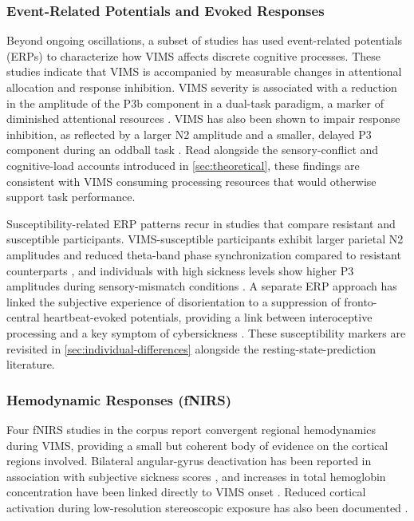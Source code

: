 \subsubsection{Event-Related Potentials and Evoked Responses}
Beyond ongoing oscillations, a subset of studies has used event-related potentials (ERPs) to characterize how VIMS affects discrete cognitive processes.
These studies indicate that VIMS is accompanied by measurable changes in attentional allocation and response inhibition.
VIMS severity is associated with a reduction in the amplitude of the P3b component in a dual-task paradigm, a marker of diminished attentional resources \cite{mimnaughVirtualRealitySickness2023}.
VIMS has also been shown to impair response inhibition, as reflected by a larger N2 amplitude and a smaller, delayed P3 component during an oddball task \cite{wuInhibitionrelatedN2P32020}.
Read alongside the sensory-conflict and cognitive-load accounts introduced in \autoref{sec:theoretical}, these findings are consistent with VIMS consuming processing resources that would otherwise support task performance.

Susceptibility-related ERP patterns recur in studies that compare resistant and susceptible participants.
VIMS-susceptible participants exhibit larger parietal N2 amplitudes and reduced theta-band phase synchronization compared to resistant counterparts \cite{weiMotionSicknesssusceptibleParticipants2019}, and individuals with high sickness levels show higher P3 amplitudes during sensory-mismatch conditions \cite{ahnTemporalDynamicsVisually2020}.
A separate ERP approach has linked the subjective experience of disorientation to a suppression of fronto-central heartbeat-evoked potentials, providing a link between interoceptive processing and a key symptom of cybersickness \cite{changIdentifyingPhysiologicalCorrelates2022}.
These susceptibility markers are revisited in \autoref{sec:individual-differences} alongside the resting-state-prediction literature.

\subsubsection{Hemodynamic Responses (fNIRS)}
Four fNIRS studies in the corpus report convergent regional hemodynamics during VIMS, providing a small but coherent body of evidence on the cortical regions involved.
Bilateral angular-gyrus deactivation has been reported in association with subjective sickness scores \cite{yeoInvestigatingCorticalActivity2024}, and increases in total hemoglobin concentration have been linked directly to VIMS onset \cite{yamamuraHemodynamicVRAdaptingUsers2021,yamamuraPleasantLocomotionReducing2020}.
Reduced cortical activation during low-resolution stereoscopic exposure has also been documented \cite{tanimuraEffectsLowResolution3D2019}.

